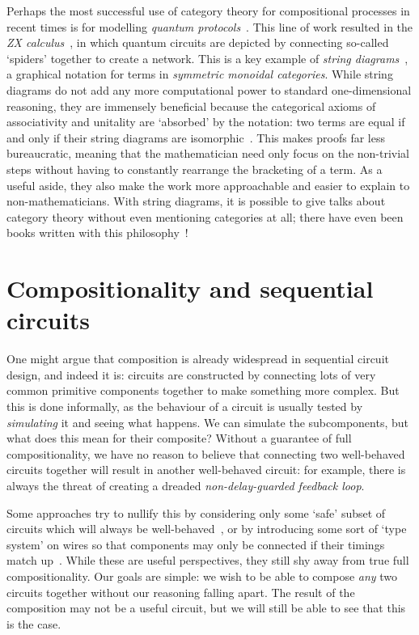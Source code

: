 Perhaps the most successful use of category theory for compositional processes
in recent times is for modelling
\emph{quantum protocols}~\cite{abramsky2004categorical}.
This line of work resulted in the
\emph{ZX calculus}~\cite{coecke2008interacting}, in which quantum
circuits are depicted by connecting so-called `spiders' together to create a
network.
This is a key example of \emph{string diagrams}~\cite{joyal1991geometry},
a graphical notation for terms in \emph{symmetric monoidal categories}.
While string diagrams do not add any more computational power to
standard one-dimensional reasoning, they are
immensely beneficial because the categorical axioms of associativity and
unitality are `absorbed' by the notation: two terms are equal if and only if
their string diagrams are isomorphic~\cite{kelly1980coherence,kissinger2014abstract}.
This makes proofs far less bureaucratic, meaning that the mathematician need
only focus on the non-trivial steps without having to constantly rearrange the
bracketing of a term.
As a useful aside, they also make the work more approachable and easier to
explain to non-mathematicians.
With string diagrams, it is possible to give talks about category theory without
even mentioning categories at all; there have even been books written with this
philosophy~\cite{coecke2018picturing}!

\section{Compositionality and sequential circuits}

One might argue that composition is already widespread in sequential circuit
design, and indeed it is: circuits are constructed by connecting lots of very
common primitive components together to make something more complex.
But this is done informally, as the behaviour of a circuit is usually tested
by \emph{simulating} it and seeing what happens.
We can simulate the subcomponents, but what does this mean for their composite?
Without a guarantee of full compositionality, we have no reason to
believe that connecting two well-behaved circuits together will result in
another well-behaved circuit: for example, there is always the threat of
creating a dreaded \emph{non-delay-guarded feedback loop}.

Some approaches try to nullify this by considering only some `safe' subset of
circuits which will always be well-behaved~\cite{christensen2021wire}, or by
introducing some sort of `type system' on wires so that components may only be
connected if their timings match up~\cite{nigam2023modular}.
While these are useful perspectives, they still shy away from true full
compositionality.
Our goals are simple: we wish to be able to compose \emph{any} two circuits
together without our reasoning falling apart.
The result of the composition may not be a useful circuit, but we will still
be able to see that this is the case.

